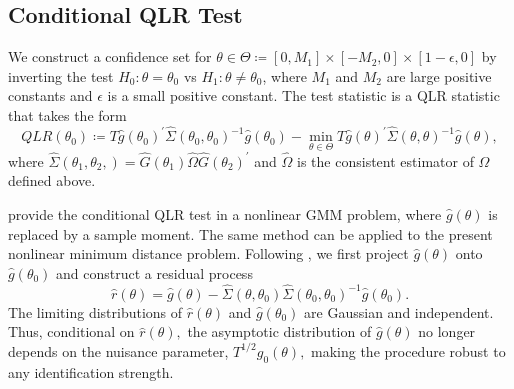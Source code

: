 \subsection{Conditional QLR Test}\label{sec:conditional QLR}

We construct a confidence set for $\theta \in \Theta \coloneqq [0, M_1] \times [-M_2, 0] \times [1 - \epsilon, 0]$ by inverting the test $ H_{0}: \theta =\theta_{0}$ vs $H_{1}: \theta \neq \theta _{0}$, where $M_1$ and $M_2$ are large positive constants and $\epsilon$ is a small positive constant. The test statistic is a QLR statistic that takes the form
%
\begin{equation}
    QLR(\theta _{0}) \coloneqq T\widehat{g}(\theta _{0})^{\prime }\widehat{\Sigma} (\theta _{0},\theta _{0})^{-1}\widehat{g}(\theta _{0})-\underset{\theta \in \Theta }{\min }T\widehat{g}(\theta )^{\prime }\widehat{\Sigma } (\theta ,\theta )^{-1}\widehat{g}(\theta ),  
    \label{QLR stat}
\end{equation}
%
where $\widehat{\Sigma }(\theta _{1},\theta _{2},)=\widehat{G}(\theta _{1})\widehat{\Omega }\widehat{G}(\theta _{2})^{\prime }$ and $\widehat{ \Omega }$ is the consistent estimator of $\Omega $ defined above.

\Textcite{andrews2016conditional} provide the conditional QLR test in a nonlinear GMM problem, where $\widehat{g}(\theta )$ is replaced by a sample moment. The same method can be applied to the present nonlinear minimum distance problem. Following \textcite{andrews2016conditional}, we first project $\widehat{g}(\theta )$ onto $\widehat{g}(\theta _{0})$ and construct a residual process
%
\begin{equation}
    \widehat{r}(\theta )=\widehat{g}(\theta )-\widehat{\Sigma }(\theta ,\theta _{0})\widehat{\Sigma }(\theta _{0},\theta _{0})^{-1}\widehat{g} (\theta _{0}).  
    \label{red process}
\end{equation}
%
The limiting distributions of $\widehat{r}(\theta )$ and $\widehat{g} (\theta _{0})$ are Gaussian and independent. Thus, conditional on $\widehat{ r}(\theta ),$ the asymptotic distribution of $\widehat{g}(\theta )$ no longer depends on the nuisance parameter, $T^{1/2}g_{0}(\theta ),$ making the procedure robust to any identification strength.


